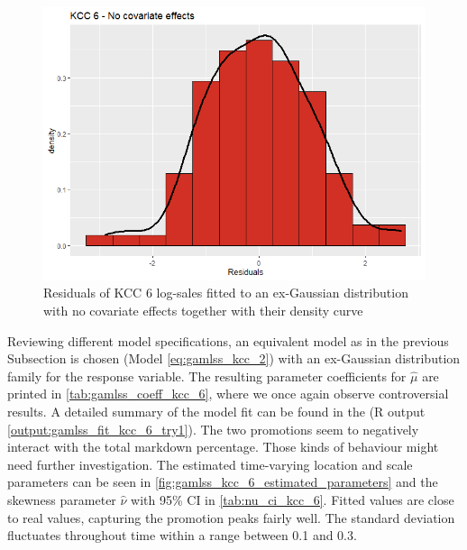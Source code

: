 \begin{figure}[H]
\centering
  \includegraphics[width=0.45\linewidth]{figures/res_kcc_6_no_covariates.png}
  \caption{Residuals of KCC 6 log-sales fitted to an ex-Gaussian distribution with no covariate effects together with their density curve}
  \label{fig:res_kcc_6_no_covariates}
\end{figure}


Reviewing different model specifications, an equivalent model as in the previous Subsection is chosen (Model \ref{eq:gamlss_kcc_2}) with an ex-Gaussian distribution family for the response variable. The resulting parameter coefficients for $\hat{\mu}$ are printed in \autoref{tab:gamlss_coeff_kcc_6}, where we once again observe controversial results. A detailed summary of the model fit can be found in the  (R output \ref{output:gamlss_fit_kcc_6_try1}). The two promotions seem to negatively interact with the total markdown percentage. Those kinds of behaviour might need further investigation.
The estimated time-varying location and scale parameters can be seen in \autoref{fig:gamlss_kcc_6_estimated_parameters} and the skewness parameter $\hat{\nu}$ with 95\% CI in \autoref{tab:nu_ci_kcc_6}. Fitted values are close to real values, capturing the promotion peaks fairly well. The standard deviation fluctuates throughout time within a range between 0.1 and 0.3.
\\





